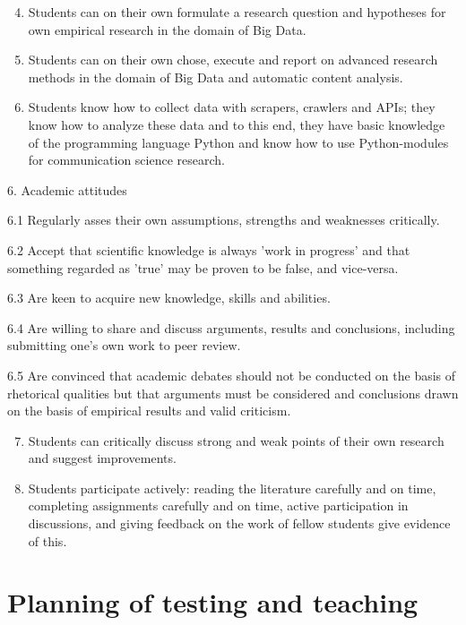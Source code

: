 \documentclass[a4paper,12pt]{report}
\begin{document}
\begin{enumerate}[A]
\setcounter{enumi}{3}
\item Students can on their own formulate a research question and hypotheses for own empirical research in the domain of Big Data.
\item Students can on their own chose, execute and report on advanced research methods in the domain of Big Data and automatic content analysis.
\item Students know how to collect data with scrapers, crawlers and APIs; they know how to analyze these data and to this end, they have basic knowledge of the programming language Python and know how to use Python-modules for communication science research.
\end{enumerate}


{\footnotesize{
6. Academic attitudes

6.1 	Regularly asses their own assumptions, strengths and weaknesses critically.


6.2	Accept that scientific knowledge is always 'work in progress' and that something
regarded as 'true' may be proven to be false, and vice-versa.


6.3 	Are keen to acquire new knowledge, skills and abilities. 


6.4 	Are willing to share and discuss arguments, results and conclusions, including submitting one's own work to peer review. 


6.5 	Are convinced that academic debates should not be conducted on the basis of rhetorical qualities but that arguments must be considered and conclusions drawn on the basis of empirical results and valid criticism.

 }}

\begin{enumerate}[A]
\setcounter{enumi}{6}
\item Students can critically discuss  strong and weak points of their own research and suggest improvements.
\item Students participate actively: reading the literature carefully and on time, completing assignments carefully and on time, active participation in discussions, and giving feedback on the work of fellow students give evidence of this.
\end{enumerate}



\chapter{Planning of testing and teaching}
\end{document}
